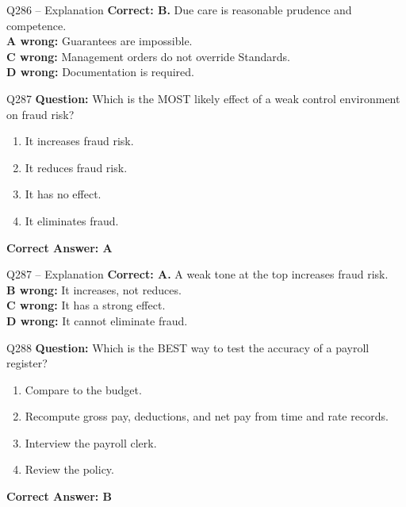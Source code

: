 \documentclass[aspectratio=169,10pt]{beamer}
\begin{document}
	\begin{frame}[t]{Q286 -- Explanation}
		\small
		\textbf{Correct: B.} Due care is reasonable prudence and competence. \\[4pt]
		\textbf{A wrong:} Guarantees are impossible. \\[2pt]
		\textbf{C wrong:} Management orders do not override Standards. \\[2pt]
		\textbf{D wrong:} Documentation is required.
	\end{frame}
	
	\begin{frame}[t]{Q287}
		\small
		\textbf{Question:} Which is the MOST likely effect of a weak control environment on fraud risk?
		\begin{enumerate}[label=\Alph*.,itemsep=1pt,topsep=2pt]
			\item It increases fraud risk.
			\item It reduces fraud risk.
			\item It has no effect.
			\item It eliminates fraud.
		\end{enumerate}
		\vspace{4pt}
		\textbf{Correct Answer: A}
	\end{frame}
	
	\begin{frame}[t]{Q287 -- Explanation}
		\small
		\textbf{Correct: A.} A weak tone at the top increases fraud risk. \\[4pt]
		\textbf{B wrong:} It increases, not reduces. \\[2pt]
		\textbf{C wrong:} It has a strong effect. \\[2pt]
		\textbf{D wrong:} It cannot eliminate fraud.
	\end{frame}
	
	\begin{frame}[t]{Q288}
		\small
		\textbf{Question:} Which is the BEST way to test the accuracy of a payroll register?
		\begin{enumerate}[label=\Alph*.,itemsep=1pt,topsep=2pt]
			\item Compare to the budget.
			\item Recompute gross pay, deductions, and net pay from time and rate records.
			\item Interview the payroll clerk.
			\item Review the policy.
		\end{enumerate}
		\vspace{4pt}
		\textbf{Correct Answer: B}
	\end{frame}
	
\end{document}
